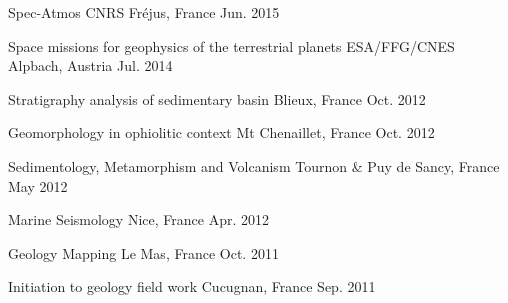 

\begin{cvhonors}

  \cvhonor
  	{Spec-Atmos}
  	{CNRS}
  	{Fréjus, France}
  	{Jun. 2015}

  \cvhonor
    {Space missions for geophysics of the terrestrial planets}
    {ESA/FFG/CNES}
    {Alpbach, Austria}
    {Jul. 2014}

\end{cvhonors}


\begin{cvhonors}

  \cvhonor
    {Stratigraphy analysis of sedimentary basin}
    {}
    {Blieux, France}
    {Oct. 2012}

  \cvhonor
    {Geomorphology in ophiolitic context}
    {}
    {Mt Chenaillet, France}
    {Oct. 2012}

  \cvhonor
    {Sedimentology, Metamorphism and Volcanism}
    {}
    {Tournon \& Puy de Sancy, France}
    {May 2012}

  \cvhonor
    {Marine Seismology}
    {}
    {Nice, France}
    {Apr. 2012}

  \cvhonor
    {Geology Mapping}
    {}
    {Le Mas, France}
    {Oct. 2011}

  \cvhonor
    {Initiation to geology field work}
    {}
    {Cucugnan, France}
    {Sep. 2011}

\end{cvhonors}
